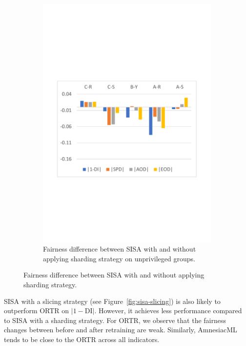\begin{figure}[htbp!]
\begin{subfigure}[b]{0.24\textwidth}
  \includegraphics[width=\textwidth]{assets/rq3-with-without-sharding-strategy-diff-unprivileged.pdf}
  \caption{Fairness difference between SISA with and without applying sharding strategy on unprivileged groups.}
  \label{fig:rq3-with-without-sharding-strategy-diff-unprivileged}
  \end{subfigure}
  \caption{Fairness difference between SISA with and without applying sharding strategy.}
  \label{fig:rq3-with-without-sharding-strategy-diff}
\vspace{-5pt}
\end{figure}


SISA with a slicing strategy (see Figure~\ref{fig:sisa-slicing}) is also likely to outperform ORTR on $|1-\textrm{DI}|$. However, it achieves less performance compared to SISA with a sharding strategy. For ORTR, we observe that the fairness changes between before and after retraining are weak. Similarly, AmnesiacML tends to be close to the ORTR across all indicators. 

